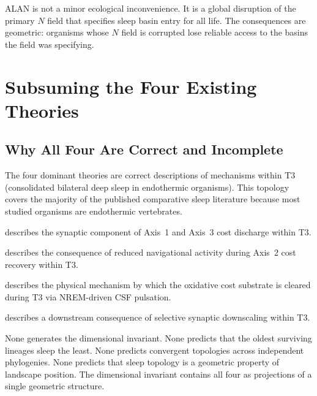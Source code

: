 \documentclass[10pt, a4paper]{article}
\begin{document}
ALAN is not a minor ecological
inconvenience. It is a global
disruption of the primary $N$ field
that specifies sleep basin entry for
all life. The consequences are geometric:
organisms whose $N$ field is corrupted
lose reliable access to the basins
the field was specifying.

\section{Subsuming the Four Existing
Theories}
\label{sec:subsuming}

\subsection{Why All Four Are Correct
and Incomplete}

The four dominant theories are correct
descriptions of mechanisms within T3
(consolidated bilateral deep sleep in
endothermic organisms). This topology
covers the majority of the published
comparative sleep literature because
most studied organisms are endothermic
vertebrates.

\begin{description}[itemsep=0.3em]
  \item[SHY] describes the synaptic
    component of Axis~1 and Axis~3
    cost discharge within T3.

  \item[Energy conservation] describes
    the consequence of reduced
    navigational activity during
    Axis~2 cost recovery within T3.

  \item[Glymphatic clearance] describes
    the physical mechanism by which
    the oxidative cost substrate is
    cleared during T3 via NREM-driven
    CSF pulsation.

  \item[Memory consolidation] describes
    a downstream consequence of
    selective synaptic downscaling
    within T3.
\end{description}

None generates the dimensional invariant.
None predicts that the oldest surviving
lineages sleep the least. None predicts
convergent topologies across independent
phylogenies. None predicts that sleep
topology is a geometric property of
landscape position. The dimensional
invariant contains all four as
projections of a single geometric
structure.
\end{document}
